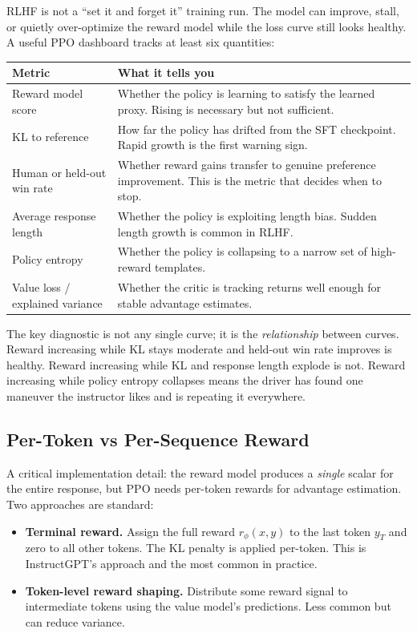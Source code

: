 RLHF is not a ``set it and forget it'' training run. The model can improve, stall, or quietly over-optimize the reward model while the loss curve still looks healthy. A useful PPO dashboard tracks at least six quantities:

\begin{center}
\begin{tabular}{lp{8.5cm}}
\toprule
\textbf{Metric} & \textbf{What it tells you} \\
\midrule
Reward model score & Whether the policy is learning to satisfy the learned proxy. Rising is necessary but not sufficient. \\
KL to reference & How far the policy has drifted from the SFT checkpoint. Rapid growth is the first warning sign. \\
Human or held-out win rate & Whether reward gains transfer to genuine preference improvement. This is the metric that decides when to stop. \\
Average response length & Whether the policy is exploiting length bias. Sudden length growth is common in RLHF. \\
Policy entropy & Whether the policy is collapsing to a narrow set of high-reward templates. \\
Value loss / explained variance & Whether the critic is tracking returns well enough for stable advantage estimates. \\
\bottomrule
\end{tabular}
\end{center}

The key diagnostic is not any single curve; it is the \emph{relationship} between curves. Reward increasing while KL stays moderate and held-out win rate improves is healthy. Reward increasing while KL and response length explode is not. Reward increasing while policy entropy collapses means the driver has found one maneuver the instructor likes and is repeating it everywhere.

\subsection{Per-Token vs Per-Sequence Reward}

A critical implementation detail: the reward model produces a \emph{single} scalar for the entire response, but PPO needs per-token rewards for advantage estimation. Two approaches are standard:

\begin{itemize}[nosep]
  \item \textbf{Terminal reward.} Assign the full reward $r_\phi(x, y)$ to the last token $y_T$ and zero to all other tokens. The KL penalty is applied per-token. This is InstructGPT's approach and the most common in practice.
  \item \textbf{Token-level reward shaping.} Distribute some reward signal to intermediate tokens using the value model's predictions. Less common but can reduce variance.
\end{itemize}

